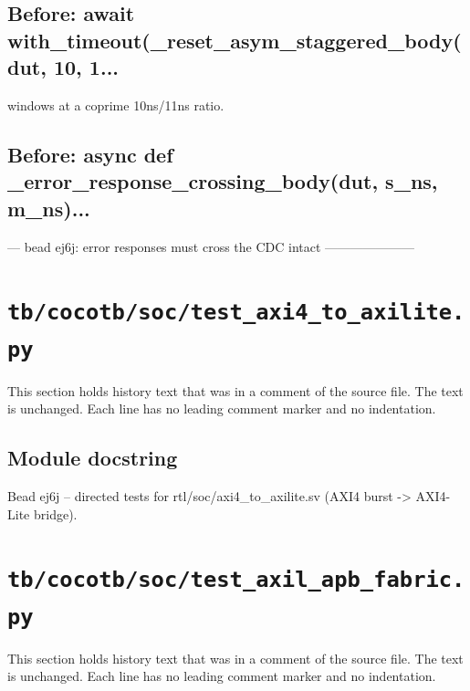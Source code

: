 \begin{record}
\subsection*{Before: await with\_timeout(\_reset\_asym\_staggered\_body(dut, 10, 1...}

\begin{textblock}
windows at a coprime 10ns/11ns ratio.
\end{textblock}

\subsection*{Before: async def \_error\_response\_crossing\_body(dut, s\_ns, m\_ns)...}

\begin{textblock}
--- bead ej6j: error responses must cross the CDC intact ---------------------
\end{textblock}

\end{record}

\section{\texttt{tb/cocotb/soc/test\_axi4\_to\_axilite.py}}\label{cr:suite:soc-test-axi4-to-axilite}

This section holds history text that was in a comment of the source file. The text is unchanged. Each line has no leading comment marker and no indentation.

\begin{record}

\subsection*{Module docstring}

\begin{textblock}
Bead ej6j -- directed tests for rtl/soc/axi4_to_axilite.sv (AXI4 burst -> AXI4-Lite bridge).
\end{textblock}

\end{record}

\section{\texttt{tb/cocotb/soc/test\_axil\_apb\_fabric.py}}\label{cr:suite:soc-test-axil-apb-fabric}

This section holds history text that was in a comment of the source file. The text is unchanged. Each line has no leading comment marker and no indentation.


